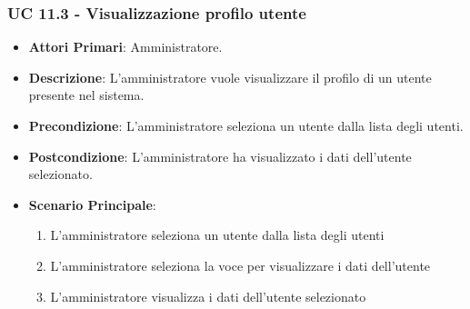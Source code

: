 			\subsubsection{UC 11.3 - Visualizzazione profilo utente}
			\begin{itemize}
				\item \textbf{Attori Primari}: Amministratore.
				\item \textbf{Descrizione}: L'amministratore vuole visualizzare il profilo di un utente presente nel sistema.
				\item \textbf{Precondizione}: L'amministratore seleziona un utente dalla lista degli utenti.
				\item \textbf{Postcondizione}: L'amministratore ha visualizzato i dati dell'utente selezionato.
				\item \textbf{Scenario Principale}:
				\begin{enumerate}
					\item{L'amministratore seleziona un utente dalla lista degli utenti}
					\item{L'amministratore seleziona la voce per visualizzare i dati dell'utente}
					\item{L'amministratore visualizza i dati dell'utente selezionato}
				\end{enumerate}
			\end{itemize}


